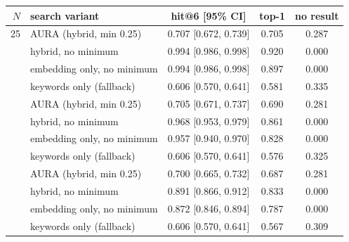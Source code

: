 \begin{tabular}{rlccc}
\toprule
$N$ & search variant & hit@6 [95\% CI] & top-1 & no result \\
\midrule
25 & AURA (hybrid, min 0.25) & 0.707 [0.672, 0.739] & 0.705 & 0.287 \\
 & hybrid, no minimum & 0.994 [0.986, 0.998] & 0.920 & 0.000 \\
 & embedding only, no minimum & 0.994 [0.986, 0.998] & 0.897 & 0.000 \\
 & keywords only (fallback) & 0.606 [0.570, 0.641] & 0.581 & 0.335 \\
\addlinespace[2pt]
100 & AURA (hybrid, min 0.25) & 0.705 [0.671, 0.737] & 0.690 & 0.281 \\
 & hybrid, no minimum & 0.968 [0.953, 0.979] & 0.861 & 0.000 \\
 & embedding only, no minimum & 0.957 [0.940, 0.970] & 0.828 & 0.000 \\
 & keywords only (fallback) & 0.606 [0.570, 0.641] & 0.576 & 0.325 \\
\addlinespace[2pt]
350 & AURA (hybrid, min 0.25) & 0.700 [0.665, 0.732] & 0.687 & 0.281 \\
 & hybrid, no minimum & 0.891 [0.866, 0.912] & 0.833 & 0.000 \\
 & embedding only, no minimum & 0.872 [0.846, 0.894] & 0.787 & 0.000 \\
 & keywords only (fallback) & 0.606 [0.570, 0.641] & 0.567 & 0.309 \\
\bottomrule
\end{tabular}
